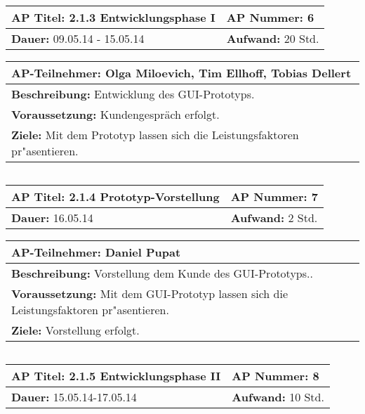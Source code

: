 \begin{verbatim}

\end{verbatim}
\begin{tabular}{|p{7.43cm}|p{7.43cm}|}
\hline
\textbf{AP Titel: }2.1.3 Entwicklungsphase I & \textbf{AP Nummer: }6 \\ 
\hline
\textbf{Dauer: }09.05.14 - 15.05.14 & \textbf{Aufwand: }20 Std.\\
\hline
\end{tabular}
\begin{tabular}{|p{15.3cm}|}
\hline
\textbf{AP-Teilnehmer: }Olga Miloevich, Tim Ellhoff, Tobias Dellert\\
\hline
\textbf{Beschreibung: }Entwicklung des GUI-Prototyps.\\
\hline
\textbf{Voraussetzung: }Kundengespräch erfolgt.\\
\hline 
\textbf{Ziele: }Mit dem Prototyp lassen sich die Leistungsfaktoren pr"asentieren.\\
\hline 
\end{tabular}
\begin{verbatim}

\end{verbatim}
\begin{tabular}{|p{7.43cm}|p{7.43cm}|}
\hline
\textbf{AP Titel: }2.1.4 Prototyp-Vorstellung & \textbf{AP Nummer: }7\\ 
\hline
\textbf{Dauer: }16.05.14 & \textbf{Aufwand: }2 Std.\\
\hline
\end{tabular}
\begin{tabular}{|p{15.3cm}|}
\hline
\textbf{AP-Teilnehmer: }Daniel Pupat\\
\hline
\textbf{Beschreibung: }Vorstellung dem Kunde des GUI-Prototyps.. \\
\hline
\textbf{Voraussetzung: }Mit dem GUI-Prototyp lassen sich die Leistungsfaktoren pr"asentieren.\\
\hline 
\textbf{Ziele: } Vorstellung erfolgt.\\
\hline 
\end{tabular}
\begin{verbatim}

\end{verbatim}
\begin{tabular}{|p{7.43cm}|p{7.43cm}|}
\hline
\textbf{AP Titel: }2.1.5 Entwicklungsphase II & \textbf{AP Nummer: }8 \\ 
\hline
\textbf{Dauer: }15.05.14-17.05.14 & \textbf{Aufwand: }10 Std.\\
\hline
\end{tabular}
